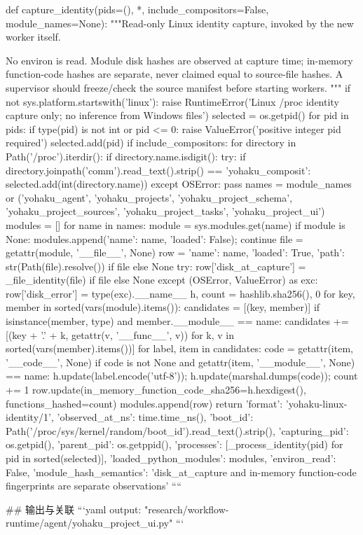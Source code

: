 def capture_identity(pids=(), *, include_compositors=False, module_names=None):
    """Read-only Linux identity capture, invoked by the new worker itself.

    No environ is read. Module disk hashes are observed at capture time; in-memory
    function-code hashes are separate, never claimed equal to source-file hashes.
    A supervisor should freeze/check the source manifest before starting workers.
    """
    if not sys.platform.startswith('linux'):
        raise RuntimeError('Linux /proc identity capture only; no inference from Windows files')
    selected = {os.getpid()}
    for pid in pids:
        if type(pid) is not int or pid <= 0: raise ValueError('positive integer pid required')
        selected.add(pid)
    if include_compositors:
        for directory in Path('/proc').iterdir():
            if directory.name.isdigit():
                try:
                    if directory.joinpath('comm').read_text().strip() == 'yohaku_composit': selected.add(int(directory.name))
                except OSError: pass
    names = module_names or ('yohaku_agent', 'yohaku_projects', 'yohaku_project_schema',
        'yohaku_project_sources', 'yohaku_project_tasks', 'yohaku_project_ui')
    modules = []
    for name in names:
        module = sys.modules.get(name)
        if module is None:
            modules.append({'name': name, 'loaded': False}); continue
        file = getattr(module, '__file__', None)
        row = {'name': name, 'loaded': True, 'path': str(Path(file).resolve()) if file else None}
        try:
            row['disk_at_capture'] = _file_identity(file) if file else None
        except (OSError, ValueError) as exc: row['disk_error'] = type(exc).__name__
        h, count = hashlib.sha256(), 0
        for key, member in sorted(vars(module).items()):
            candidates = [(key, member)]
            if isinstance(member, type) and member.__module__ == name:
                candidates += [(key + '.' + k, getattr(v, '__func__', v)) for k, v in sorted(vars(member).items())]
            for label, item in candidates:
                code = getattr(item, '__code__', None)
                if code is not None and getattr(item, '__module__', None) == name:
                    h.update(label.encode('utf-8')); h.update(marshal.dumps(code)); count += 1
        row.update(in_memory_function_code_sha256=h.hexdigest(), functions_hashed=count)
        modules.append(row)
    return {'format': 'yohaku-linux-identity/1', 'observed_at_ns': time.time_ns(),
        'boot_id': Path('/proc/sys/kernel/random/boot_id').read_text().strip(),
        'capturing_pid': os.getpid(), 'parent_pid': os.getppid(),
        'processes': [_process_identity(pid) for pid in sorted(selected)],
        'loaded_python_modules': modules, 'environ_read': False,
        'module_hash_semantics': 'disk_at_capture and in-memory function-code fingerprints are separate observations'}
````

## 输出与关联
```yaml
output: "research/workflow-runtime/agent/yohaku_project_ui.py"
```
